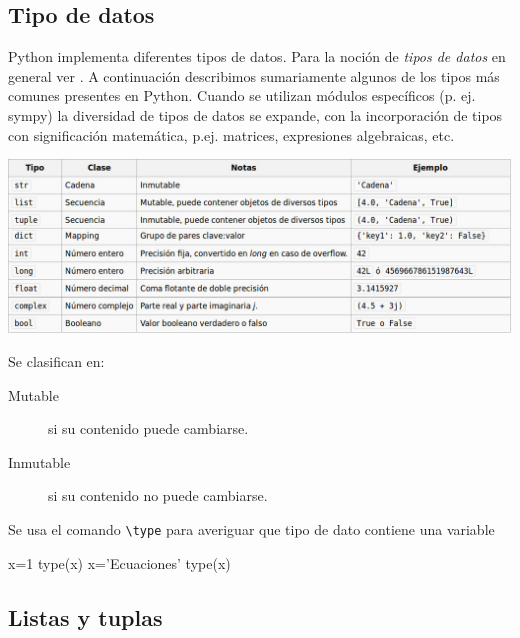 \subsection{Tipo de datos}

Python implementa diferentes tipos de datos. Para la noción de \emph{tipos de datos} en 
general 
ver \cite{wiki:tipo_dato}\link. A continuación describimos sumariamente algunos de los tipos 
más comunes presentes en Python. Cuando se utilizan módulos específicos (p. ej. sympy) la 
diversidad  de tipos de datos se expande, con la incorporación de tipos con significación
matemática, p.ej. matrices,  expresiones algebraicas, etc. 


\includegraphics[scale=.4]{imagenes/tipo_datos.jpg}

Se clasifican en:
\begin{description}
 \item[Mutable] si su contenido puede cambiarse.
 \item[Inmutable] si su contenido no puede cambiarse.
\end{description}

Se usa el comando \verb~\type~ para averiguar que tipo de dato contiene una variable

 \begin{pyconsole}
x=1
type(x)
x='Ecuaciones'
type(x)
\end{pyconsole}





\subsection{Listas y tuplas}


